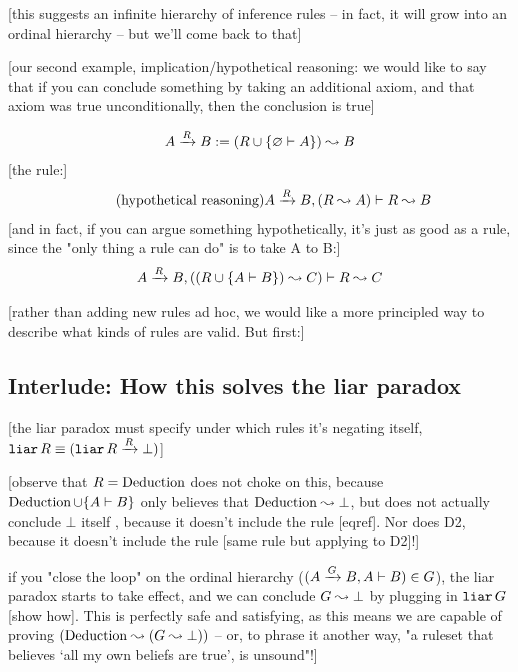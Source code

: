 \documentclass{article}
\begin{document}
  [this suggests an infinite hierarchy of inference rules – in fact, it will grow into an ordinal hierarchy – but we'll come back to that]
  
  [our second example, implication/hypothetical reasoning: we would like to say that if you can conclude something by taking an additional axiom, and that axiom was true unconditionally, then the conclusion is true]
  
  \renewcommand{\implies}[1]{\xrightarrow{#1}}
  
  \begin{align*}
    A \implies{R} B := (R \union \singleton{\emptyset \infrule A}) \concludes B\\
  \end{align*}
  [the rule:]
  \begin{align*}
    \tag{hypothetical reasoning}\label{hyp}
    A \implies{R} B, (R \concludes A) &\vdash R \concludes B\\
  \end{align*}
  [and in fact, if you can argue something hypothetically, it's just as good as a rule, since the "only thing a rule can do" is to take A to B:]
  \begin{align*}
    A \implies{R} B, ((R \union \singleton{A \infrule B}) \concludes C) &\vdash R \concludes C  \\
  \end{align*}
  
  [rather than adding new rules ad hoc, we would like a more principled way to describe what kinds of rules are valid. But first:]
  
  \subsection{Interlude: How this solves the liar paradox}
  
  [the liar paradox must specify under which rules it's negating itself, $\name{liar}R \equiv (\name{liar}R \implies{R} \bot)$]
  
  [observe that $R = \operatorname{\mathrm{Deduction}}$ does not choke on this, because $\operatorname{\mathrm{Deduction}} \cup \{A \vdash B\}$ only believes that $\operatorname{\mathrm{Deduction}} \leadsto \bot$, but does not actually conclude $\bot$ itself , because it doesn't include the rule [eqref]. Nor does D2, because it doesn't include the rule [same rule but applying to D2]!]
  
   if you "close the loop" on the ordinal hierarchy ($(A \implies{G} B, A \infrule B) \in G$), the liar paradox starts to take effect, and we can conclude $G \leadsto \bot$ by plugging in $\operatorname{\texttt{liar}}G$ [show how]. This is perfectly safe and satisfying, as this means we are capable of proving $(\operatorname{\mathrm{Deduction}} \leadsto (G \leadsto \bot))$ – or, to phrase it another way, "a ruleset that believes `all my own beliefs are true', is unsound"!]
   
\end{document}
